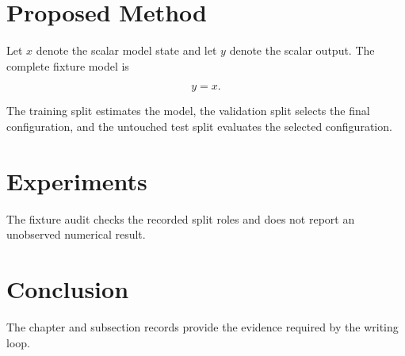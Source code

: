 \documentclass{article}
\begin{document}
\section{Proposed Method}

Let $x$ denote the scalar model state and let $y$ denote the scalar output. The
complete fixture model is

\begin{equation}
  y=x.
  \label{eq:writing-loop-fixture}
\end{equation}

The training split estimates the model, the validation split selects the final
configuration, and the untouched test split evaluates the selected
configuration.

\section{Experiments}

The fixture audit checks the recorded split roles and does not report an
unobserved numerical result.

\section{Conclusion}

The chapter and subsection records provide the evidence required by the
writing loop.
\end{document}
